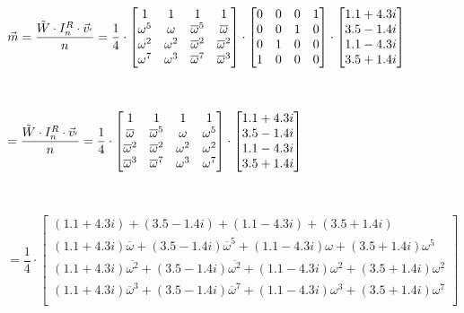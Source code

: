 $\vec{m} = \dfrac{\tilde{W} \cdot I_n^R \cdot \vec{v}_{'}}{n} = \dfrac{1}{4} \cdot \begin{bmatrix}
1 & 1 & 1 & 1\\
\omega^5 & \omega & \overline{\omega}^5 & \overline{\omega}\\
\omega^2 & \omega^2 & \overline{\omega}^2 & \overline{\omega}^2\\
\omega^7 & \omega^3 & \overline{\omega}^7 & \overline{\omega}^3\\
\end{bmatrix} \cdot
\begin{bmatrix}
0 & 0 & 0 & 1 \\
0 & 0 & 1 & 0 \\
0 & 1 & 0 & 0 \\
1 & 0 & 0 & 0
\end{bmatrix}
\cdot
\begin{bmatrix} 1.1 + 4.3i\\3.5 - 1.4i\\1.1 - 4.3i\\3.5 + 1.4i \end{bmatrix}$

$ $

$= \dfrac{\tilde W \cdot I_n^R \cdot \vec{v}_{'}}{n} = \dfrac{1}{4} \cdot\begin{bmatrix}
1 & 1 & 1 & 1\\
\overline{\omega} & \overline{\omega}^5 & \omega  & \omega^5\\
\overline{\omega}^2 & \overline{\omega}^2 & \omega^2 & \omega^2\\
\overline{\omega}^3 & \overline{\omega}^7 & \omega^3 & \omega^7\\
\end{bmatrix}
\cdot
\begin{bmatrix} 1.1 + 4.3i\\3.5 - 1.4i\\1.1 - 4.3i\\3.5 + 1.4i \end{bmatrix}$

$ $

$= \dfrac{1}{4} \cdot
\begin{bmatrix}
(1.1 + 4.3i) + (3.5 - 1.4i) + (1.1 - 4.3i) + (3.5 + 1.4i)\\
(1.1 + 4.3i)\overline{\omega} + (3.5 - 1.4i)\overline{\omega}^5 + (1.1 - 4.3i)\omega+ (3.5 + 1.4i)\omega^5 \\
(1.1 + 4.3i)\overline{\omega^2} + (3.5 - 1.4i)\overline{\omega^2} + (1.1 - 4.3i)\omega^2+ (3.5 + 1.4i)\omega^2 \\
(1.1 + 4.3i)\overline{\omega}^3 + (3.5 - 1.4i)\overline{\omega}^7 + (1.1 - 4.3i)\omega^3 + (3.5 + 1.4i)\omega^7 \\
\end{bmatrix}$

